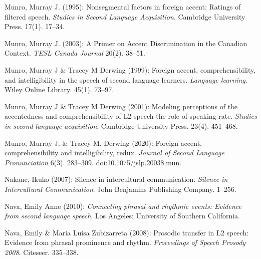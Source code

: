 \begin{styleBibliography}
Munro, Murray J. (1995): Nonsegmental factors in foreign accent: Ratings of filtered speech. \textit{Studies in Second Language Acquisition}. Cambridge University Press. 17(1). 17–34.
\end{styleBibliography}

\begin{styleBibliography}
Munro, Murray J. (2003): A Primer on Accent Discrimination in the Canadian Context. \textit{TESL Canada Journal} 20(2). 38–51.
\end{styleBibliography}

\begin{styleBibliography}
Munro, Murray J \& Tracey M Derwing (1999): Foreign accent, comprehensibility, and intelligibility in the speech of second language learners. \textit{Language learning}. Wiley Online Library. 45(1). 73–97.
\end{styleBibliography}

\begin{styleBibliography}
Munro, Murray J \& Tracey M Derwing (2001): Modeling perceptions of the accentedness and comprehensibility of L2 speech the role of speaking rate. \textit{Studies in second language acquisition}. Cambridge University Press. 23(4). 451–468.
\end{styleBibliography}

\begin{styleBibliography}
Munro, Murray J. \& Tracey M. Derwing (2020): Foreign accent, comprehensibility and intelligibility, redux. \textit{Journal of Second Language Pronunciation} 6(3). 283–309. doi:10.1075/jslp.20038.mun.
\end{styleBibliography}

\begin{styleBibliography}
Nakane, Ikuko (2007): Silence in intercultural communication. \textit{Silence in Intercultural Communication}. John Benjamins Publishing Company. 1–256.
\end{styleBibliography}

\begin{styleBibliography}
Nava, Emily Anne (2010): \textit{Connecting phrasal and rhythmic events: Evidence from second language speech}. Los Angeles: University of Southern California.
\end{styleBibliography}

\begin{styleBibliography}
Nava, Emily \& Maria Luisa Zubizarreta (2008): Prosodic transfer in L2 speech: Evidence from phrasal prominence and rhythm. \textit{Proceedings of Speech Prosody 2008}. Citeseer. 335–338.
\end{styleBibliography}

